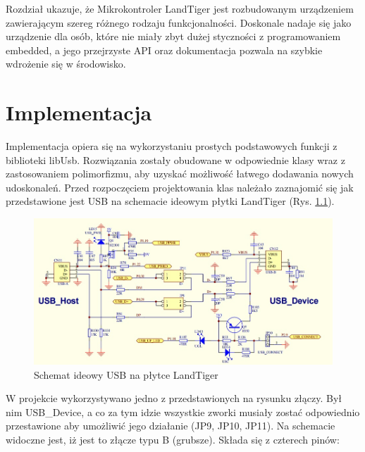 \documentclass{BscUS}
\newcommand\blankpage{%
    \null
    \thispagestyle{empty}%
    \newpage}
\begin{document}
\indent Rozdział ukazuje, że Mikrokontroler LandTiger jest rozbudowanym urządzeniem zawierającym szereg różnego rodzaju funkcjonalności. Doskonale nadaje się jako urządzenie dla osób, które nie miały zbyt dużej styczności z programowaniem embedded, a jego przejrzyste API oraz dokumentacja pozwala na szybkie wdrożenie się w środowisko. \cite{landtigerDesc}

\chapter{Implementacja}
\label{implementationChapter}
Implementacja opiera się na wykorzystaniu prostych podstawowych funkcji z biblioteki libUsb. Rozwiązania zostały obudowane w odpowiednie klasy wraz z zastosowaniem polimorfizmu, aby uzyskać możliwość łatwego dodawania nowych udoskonaleń. Przed rozpoczęciem projektowania klas należało zaznajomić się jak przedstawione jest USB na schemacie ideowym płytki LandTiger (Rys. \ref{fig:usbSchema}).
\begin{figure}[H]
\centering
\includegraphics[width=1\textwidth]{./img/usbSchema}
\caption{Schemat ideowy USB na płytce LandTiger\cite{landtigerDesc}} 
\label{fig:usbSchema}
\end{figure}
\noindent W projekcie wykorzystywano jedno z przedstawionych na rysunku złączy. Był nim USB\_Device, a co za tym idzie wszystkie zworki musiały zostać odpowiednio przestawione aby umożliwić jego działanie (JP9, JP10, JP11). Na schemacie widoczne jest, iż jest to złącze typu B (grubsze). Składa się z czterech pinów:
\end{document}
